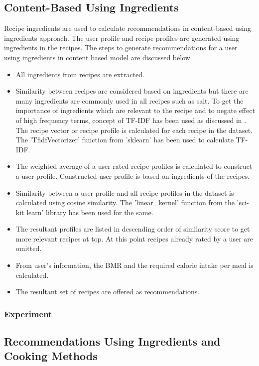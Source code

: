 \subsection{Content-Based Using Ingredients}
Recipe ingredients are used to calculate recommendations in content-based using ingredients approach. The user profile and recipe profiles are generated using ingredients in the recipes. The steps to generate recommendations for a user using ingredients in content based model are discussed below.
\begin{itemize}
\item All ingredients from recipes are extracted. 
\item Similarity between recipes are considered based on ingredients but there are many ingredients are commonly used in all recipes such as salt. To get the importance of ingredients which are relevant to the recipe and to negate effect of high frequency terms, concept of TF-IDF has been used as discussed in . The recipe vector or recipe profile is calculated for each recipe in the dataset. The 'TfidfVectorizer' function from 'sklearn' has been used to calculate TF-IDF.
\item The weighted average of a user rated recipe profiles is calculated to construct a user profile. Constructed user profile is based on ingredients of the recipes.  
\item Similarity between a user profile and all recipe profiles in the dataset is calculated using cosine similarity. The 'linear\_kernel' function from the 'sci-kit learn' library has been used for the same. 
\item The resultant profiles are listed in descending order of similarity score to get more relevant recipes at top. At this point recipes already rated by a user are omitted. 
\item From user's information, the BMR and the required calorie intake per meal is calculated. 
\item The resultant set of recipes are offered as recommendations. 
\end{itemize}
\subsubsection{Experiment}
\label{sec:cb_ingred_exp}

\subsection{Recommendations Using Ingredients and Cooking Methods}
